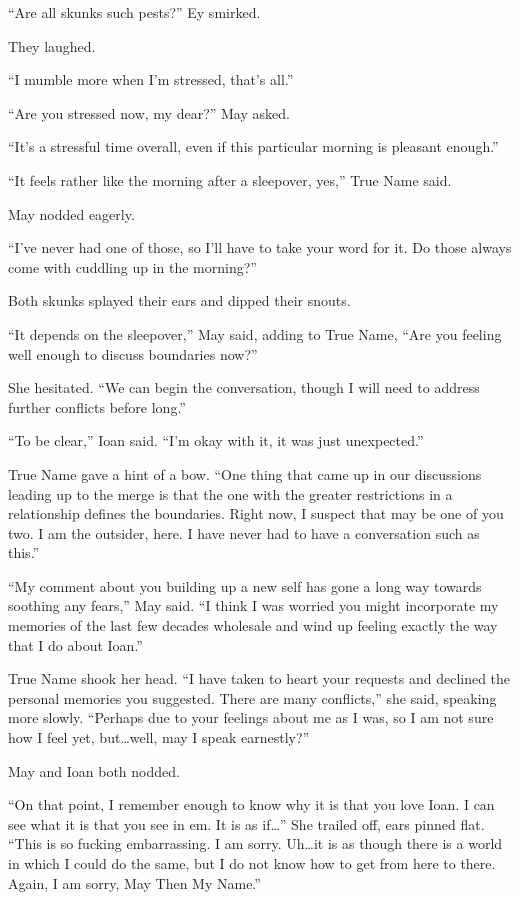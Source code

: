 ``Are all skunks such pests?'' Ey smirked.

They laughed.

``I mumble more when I'm stressed, that's all.''

``Are you stressed now, my dear?'' May asked.

``It's a stressful time overall, even if this particular morning is pleasant enough.''

``It feels rather like the morning after a sleepover, yes,'' True Name said.

May nodded eagerly.

``I've never had one of those, so I'll have to take your word for it. Do those always come with cuddling up in the morning?''

Both skunks splayed their ears and dipped their snouts.

``It depends on the sleepover,'' May said, adding to True Name, ``Are you feeling well enough to discuss boundaries now?''

She hesitated. ``We can begin the conversation, though I will need to address further conflicts before long.''

``To be clear,'' Ioan said. ``I'm okay with it, it was just unexpected.''

True Name gave a hint of a bow. ``One thing that came up in our discussions leading up to the merge is that the one with the greater restrictions in a relationship defines the boundaries. Right now, I suspect that may be one of you two. I am the outsider, here. I have never had to have a conversation such as this.''

``My comment about you building up a new self has gone a long way towards soothing any fears,'' May said. ``I think I was worried you might incorporate my memories of the last few decades wholesale and wind up feeling exactly the way that I do about Ioan.''

True Name shook her head. ``I have taken to heart your requests and declined the personal memories you suggested. There are many conflicts,'' she said, speaking more slowly. ``Perhaps due to your feelings about me as I was, so I am not sure how I feel yet, but\ldots well, may I speak earnestly?''

May and Ioan both nodded.

``On that point, I remember enough to know why it is that you love Ioan. I can see what it is that you see in em. It is as if\ldots{}'' She trailed off, ears pinned flat. ``This is so fucking embarrassing. I am sorry. Uh\ldots it is as though there is a world in which I could do the same, but I do not know how to get from here to there. Again, I am sorry, May Then My Name.''

